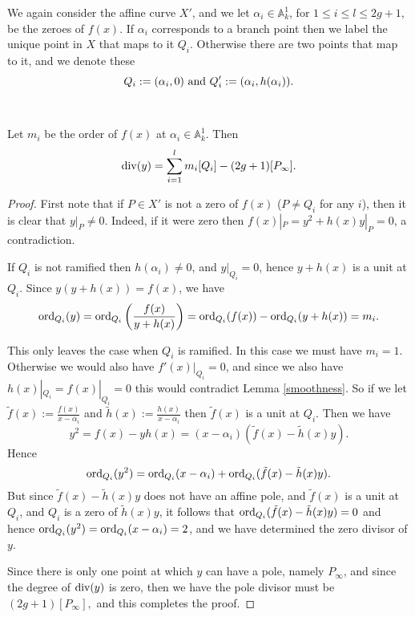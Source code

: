 We again consider the affine curve $X'$, and we let $\alpha_i \in \mathbb A_k^1$, for $1\leq i\leq l \leq 2g+1$, be the zeroes of $f(x)$.
If $\alpha_i$ corresponds to a branch point then we label the unique point in $X$ that maps to it $Q_i$.
Otherwise there are two points that map to it, and we denote these \[ Q_i:=(\alpha_i,0)\ {\rm and}\ Q_i':=(\alpha_i,h(\alpha_i)).\]


~


\begin{lem}\label{ychar2}
 Let $m_i$ be the order of $f(x)$ at $\alpha_i\in \mathbb A_k^1$.
 Then 
 \[
  \operatorname{div}(y) = \sum_{i=1}^l m_i[Q_i] - (2g+1)[P_\infty].
 \]

\end{lem}
\begin{proof}
 First note that if $P\in X'$ is not a zero of $f(x)$ (\ie $P\neq Q_i$ for any $i$), then it is clear that $y|_P \neq 0$.
 Indeed, if it were zero then $f(x)|_P = y^2 + h(x)y|_P = 0$, a contradiction.
 
 If $Q_i$ is not ramified then $h(\alpha_i) \neq 0$, and $y|_{Q_i} = 0$, hence $y+h(x)$ is a unit at $Q_i$.
 Since $y(y+h(x)) = f(x)$, we have
 \[
  \operatorname{ord}_{Q_i}(y) = \operatorname{ord}_{Q_i}\left(\frac{f(x)}{y+h(x)}\right) = \operatorname{ord}_{Q_i}(f(x)) -\operatorname{ord}_{Q_i}(y+h(x)) = m_i.
 \]

 This only leaves the case when $Q_i$ is ramified. 
 In this case we must have $m_i=1$.
 Otherwise we would also have $f'(x)|_{Q_i} = 0$, and since we also have $h(x)|_{Q_i} = f(x)|_{Q_i} = 0$ this would contradict Lemma \ref{smoothness}.
 So if we let $\tilde f(x) := \frac{f(x)}{x-\alpha_i}$ and $\tilde h(x) := \frac{h(x)}{x-\alpha_i}$ then $\tilde f(x)$ is a unit at $Q_i$.
 Then we have \[y^2 = f(x) - yh(x) = (x-\alpha_i)(\tilde f(x) - \tilde h(x)y).\]
 Hence
 \[
  \operatorname{ord}_{Q_i}(y^2) = \operatorname{ord}_{Q_i}(x-\alpha_i) + \operatorname{ord}_{Q_i}(\tilde f(x) - \tilde h(x)y).
 \]
But since $\tilde f(x) - \tilde h(x) y$ does not have an affine pole, and $\tilde f(x)$ is a unit at $Q_i$, and $Q_i$ is a zero of $\tilde h(x) y$, it follows that $\operatorname{ord}_{Q_i}(\tilde f(x) -  \tilde h(x) y) = 0$
and hence $\operatorname{ord}_{Q_i}(y^2) = \operatorname{ord}_{Q_i}(x-\alpha_i) = 2$, and we have determined the zero divisor of $y$.

Since there is only one point at which $y$ can have a pole, namely $P_\infty$, and since the degree of $\operatorname{div} (y)$ is zero, then we have the pole divisor must be
$
 (2g+1)[P_\infty],
$
and this completes the proof.
\end{proof}



